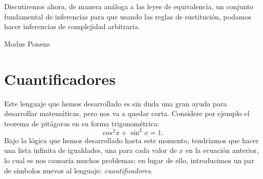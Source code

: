 \documentclass{book}
\theoremstyle{definition}
\begin{document}
Discutiremos ahora, de manera análoga a las leyes de equivalencia, un conjunto fundamental de inferencias para que usando las reglas de sustitución, podamos hacer inferencias de complejidad arbitraria.
\begin{description}
	\item[Modus Ponens] %
\end{description}

\section{Cuantificadores}
Este lenguaje que hemos desarrollado es sin duda una gran ayuda para desarrollar matemáticas, pero nos va a quedar corta.
Considere por ejemplo el teorema de pitágoras en su forma trigonométrica: \[cos^2 x + \sin^2 x = 1.\]
Bajo la lógica que hemos desarrollado hasta este momento, tendríamos que hacer una lista infinita de igualdades, una para cada valor de $x$ en la ecuación anterior, lo cual es nos causaría muchos problemas;
en lugar de ello, introducimos un par de símbolos nuevos al lenguaje: \emph{cuantificadores}.
\end{document}
